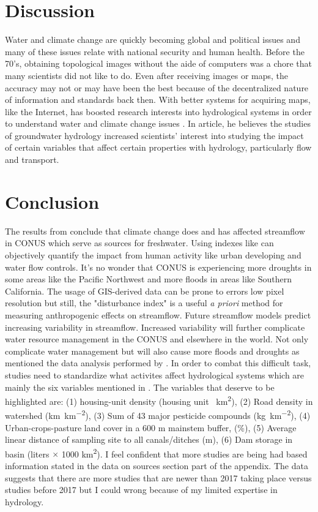 \documentclass[a4paper,man,biblatex]{apa7}
\begin{document}
\section{Discussion} Water and climate change are quickly becoming global and political issues and many of these issues relate with national security and human health. Before the 70's, obtaining topological images without the aide of computers was a chore that many scientists did not like to do. Even after receiving images or maps, the accuracy may not or may have been the best because of the decentralized nature of information and standards back then. With better systems for acquiring maps, like the Internet, has boosted research interests into hydrological systems in order to understand water and climate change issues \autocite{bras_1999}. In \textcite{bras_1999} article, he believes the studies of groundwater hydrology increased scientists' interest into studying the impact of certain variables that affect certain properties with hydrology, particularly flow and transport.\\
\section{Conclusion} The results from \textcite{rice_2016} conclude that climate change does and has affected streamflow in CONUS which serve as sources for freshwater. Using indexes like \textcite{falcone_2016} can objectively quantify the impact from human activity like urban developing and water flow controls. It's no wonder that CONUS is experiencing more droughts in some areas like the Pacific Northwest and more floods in areas like Southern California. The usage of GIS-derived data can be prone to errors low pixel resolution but still, the "disturbance index" is a useful \textit{a priori} method for measuring anthropogenic effects on streamflow. Future streamflow models predict increasing variability in streamflow. Increased variability will further complicate  water resource management in the CONUS and elsewhere in the world. Not only complicate water management but will also cause more floods and droughts as mentioned the data analysis performed by \textcite{mallakpour_2018}. In order to combat this difficult task, studies need to standardize what activites affect hydrological systems which are mainly the six variables mentioned in \textcite{rice_2016}. The variables that deserve to be highlighted are: (1) housing-unit density (housing unit \si{\per\square\kilo\meter}), (2) Road density in watershed (\si{\kilo\meter\per\square\kilo\meter}), (3) Sum of 43 major pesticide compounds (\si{\kilo\gram\per\square\kilo\meter}), (4) Urban-crops-pasture land cover in a 600 m mainstem buffer, (\%), (5) Average linear distance of sampling site to all canals/ditches (m), (6) Dam storage in basin (liters $\times$ 1000 \si{\square\kilo\meter}). I feel confident that more studies are being had based information stated in the data on sources section part of the appendix. The data suggests that there are more studies that are newer than 2017 taking place versus studies before 2017 but I could wrong because of my limited expertise in hydrology.
\end{document}
